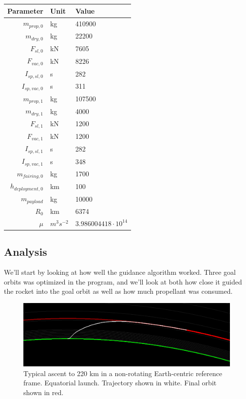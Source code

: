 \documentclass[11pt]{article}
\begin{document}
\begin{center}
\begin{tabular}{ r  | l | l  }
  Parameter & Unit & Value \\
  \hline
  $m_{prop,0}$ & kg & 410900 \\
  $m_{dry,0}$ & kg & 22200 \\
  $F_{sl,0}$ & kN & 7605 \\
  $F_{vac,0}$ & kN & 8226 \\
  $I_{sp,sl,0}$ & s & 282 \\
  $I_{sp,vac,0}$ & s & 311 \\
  \hline
  $m_{prop,1}$ & kg & 107500 \\
  $m_{dry,1}$ & kg & 4000 \\
  $F_{sl,1}$ & kN & 1200 \\
  $F_{vac,1}$ & kN & 1200 \\
  $I_{sp,sl,1}$ & s & 282 \\
  $I_{sp,vac,1}$ & s & 348 \\
  \hline
  $m_{fairing,0}$ & kg & 1700 \\
  $h_{deployment,0}$ & km & 100 \\
  \hline
  $m_{payload}$ & kg & 10000 \\
  \hline
  $R_0$ & km & 6374 \\
  $\mu$ & $m^3 s^{−2}$ & $3.986004418\cdot10^{14}$ \\
\end{tabular}
\end{center}

\subsection{Analysis}
We'll start by looking at how well the guidance algorithm worked. Three goal orbits was optimized in the program, and we'll look at both how close it guided the rocket into the goal orbit as well as how much propellant was consumed.

\begin{figure}[H]
  \centering
  \includegraphics[width=\textwidth]{./220km.png}
  \caption{
    \label{fig:trajectory}
    Typical ascent to 220 km in a non-rotating Earth-centric reference frame. Equatorial launch. Trajectory shown in white. Final orbit shown in red.}
\end{figure}
\end{document}
